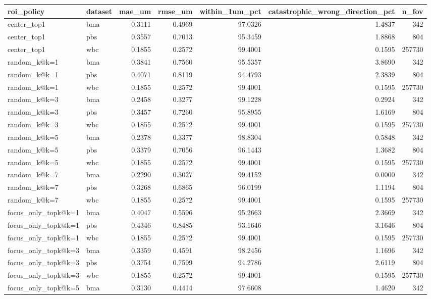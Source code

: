 \begin{tabular}{llrrrrr}
\toprule
roi_policy & dataset & mae_um & rmse_um & within_1um_pct & catastrophic_wrong_direction_pct & n_fov \\
\midrule
center_top1 & bma & 0.3111 & 0.4969 & 97.0326 & 1.4837 & 342 \\
center_top1 & pbs & 0.3557 & 0.7013 & 95.3459 & 1.8868 & 804 \\
center_top1 & wbc & 0.1855 & 0.2572 & 99.4001 & 0.1595 & 257730 \\
random_k@k=1 & bma & 0.3841 & 0.7560 & 95.5357 & 3.8690 & 342 \\
random_k@k=1 & pbs & 0.4071 & 0.8119 & 94.4793 & 2.3839 & 804 \\
random_k@k=1 & wbc & 0.1855 & 0.2572 & 99.4001 & 0.1595 & 257730 \\
random_k@k=3 & bma & 0.2458 & 0.3277 & 99.1228 & 0.2924 & 342 \\
random_k@k=3 & pbs & 0.3457 & 0.7260 & 95.8955 & 1.6169 & 804 \\
random_k@k=3 & wbc & 0.1855 & 0.2572 & 99.4001 & 0.1595 & 257730 \\
random_k@k=5 & bma & 0.2378 & 0.3377 & 98.8304 & 0.5848 & 342 \\
random_k@k=5 & pbs & 0.3379 & 0.7056 & 96.1443 & 1.3682 & 804 \\
random_k@k=5 & wbc & 0.1855 & 0.2572 & 99.4001 & 0.1595 & 257730 \\
random_k@k=7 & bma & 0.2290 & 0.3027 & 99.4152 & 0.0000 & 342 \\
random_k@k=7 & pbs & 0.3268 & 0.6865 & 96.0199 & 1.1194 & 804 \\
random_k@k=7 & wbc & 0.1855 & 0.2572 & 99.4001 & 0.1595 & 257730 \\
focus_only_topk@k=1 & bma & 0.4047 & 0.5596 & 95.2663 & 2.3669 & 342 \\
focus_only_topk@k=1 & pbs & 0.4346 & 0.8485 & 93.1646 & 3.1646 & 804 \\
focus_only_topk@k=1 & wbc & 0.1855 & 0.2572 & 99.4001 & 0.1595 & 257730 \\
focus_only_topk@k=3 & bma & 0.3359 & 0.4591 & 98.2456 & 1.1696 & 342 \\
focus_only_topk@k=3 & pbs & 0.3754 & 0.7599 & 94.2786 & 2.6119 & 804 \\
focus_only_topk@k=3 & wbc & 0.1855 & 0.2572 & 99.4001 & 0.1595 & 257730 \\
focus_only_topk@k=5 & bma & 0.3130 & 0.4414 & 97.6608 & 1.4620 & 342 \\

\end{tabular}
